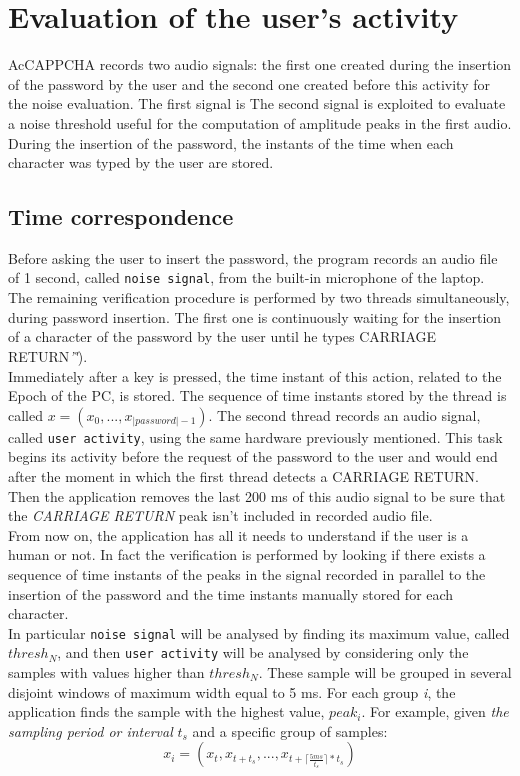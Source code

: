 \section{Evaluation of the user's activity}\label{AcCAPPCHA:user_activity}
AcCAPPCHA records two audio signals: the first one created during the insertion of the password by the user and the second one created before this activity for the noise evaluation. The first signal is The second signal is exploited to evaluate a noise threshold useful for the computation of amplitude peaks in the first audio.
During the insertion of the password, the instants of the time when each character was typed by the user are stored. 

\subsection{Time correspondence}\label{AcCAPPCHA:time_correspondence}
Before asking the user to insert the password, the program records an audio file of 1 second, called \texttt{noise signal}, from the built-in microphone of the laptop. The remaining verification procedure is performed by two threads simultaneously, during password insertion. The first one is continuously waiting for the insertion of a character of the password by the user until he types CARRIAGE RETURN\textit{'\r'}).\\
Immediately after a key is pressed, the time instant of this action, related to the Epoch of the PC, is stored. The sequence of time instants stored by the thread is called $x=(x_0, ..., x_{|password|-1})$. The second thread records an audio signal, called \texttt{user activity}, using the same hardware previously mentioned. This task begins its activity before the request of the password to the user and would end after the moment in which the first thread detects a CARRIAGE RETURN. Then the application removes the last 200 ms of this audio signal to be sure that the \textit{CARRIAGE RETURN} peak isn't included in recorded audio file.\\
From now on, the application has all it needs to understand if the user is a human or not. In fact the verification is performed by looking if there exists a sequence of time instants of the peaks in the signal recorded in parallel to the insertion of the password and the time instants manually stored for each character.\\
In particular \texttt{noise signal} will be analysed by finding its maximum value, called $thresh_N$, and then \texttt{user activity} will be analysed by considering only the samples with values higher than $thresh_N$. These sample will be grouped in several disjoint windows of maximum width equal to 5 ms. For each group \textit{i}, the application finds the sample with the highest value, $peak_i$. For example, given \textit{the sampling period or interval} $t_s$ and a specific group of samples: $$x_i = (x_t, x_{t+t_s}, ..., x_{t+\lceil \frac{5ms}{t_s}\rceil * t_s})$$
